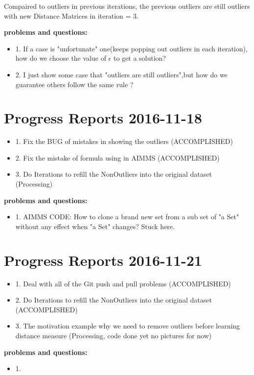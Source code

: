 \documentclass[]{article}
\begin{document}
Compaired to outliers in previous iterations, the previous outliers are still outliers with new Distance Matrices in iteration = 3.

{\bf problems and questions:}
\begin{itemize}
\item 1. If a case is "unfortunate" one(keeps popping out outliers in each iteration), how do we choose the value of $\epsilon$ to get a solution?

\item 2. I just show some case that "outliers are still outliers",but how do we guarantee others follow the same rule ?

\end{itemize}
\newpage

\section{Progress Reports 2016-11-18}

\begin{itemize}
\item 1. Fix the BUG of mistakes in showing the outliers (ACCOMPLISHED)

\item 2. Fix the mistake of formula using in AIMMS (ACCOMPLISHED)

\item 3. Do Iterations to refill the NonOutliers into the original dataset (Processing)


\end{itemize}
{\bf problems and questions:}
\begin{itemize}
\item 1. AIMMS CODE: How to clone a brand new set from a sub set of "a Set" without any effect when "a Set" changes? Stuck here. 

\end{itemize}


\newpage

\section{Progress Reports 2016-11-21}




\begin{itemize}
\item 1. Deal with all of the Git push and pull problems (ACCOMPLISHED)

\item 2. Do Iterations to refill the NonOutliers into the original dataset (ACCOMPLISHED)

\item 3. The motivation example why we need to remove outliers before learning distance measure (Processing, code done yet no pictures for now)


\end{itemize}
{\bf problems and questions:}
\begin{itemize}
\item 1. 


\end{itemize}
\newpage
\end{document}
